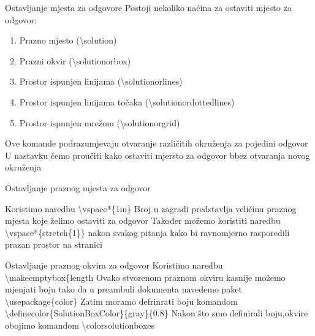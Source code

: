 \documentclass[addpoints,answers]{beamer}
\begin{document}
\begin{frame}{Ostavljanje mjesta za odgovore}
Postoji nekoliko naćina za ostaviti mjesto za odgovor:
\begin{enumerate}
\item Prazno mjesto (\color{blue}\textbackslash{solution}\color{black})
\item Prazni okvir (\color{blue}\textbackslash{solutionorbox}\color{black})
\item Prostor ispunjen linijama (\color{blue}\textbackslash{solutionorlines}\color{black})
\item Prostor ispunjen linijama točaka (\color{blue}\textbackslash{solutionordottedlines}\color{black})
\item Prostor ispunjen mrežom (\color{blue}\textbackslash{solutionorgrid}\color{black})
\newline\newline
\end{enumerate}
Ove komande podrazumjevaju otvaranje različitih okruženja za pojedini odgovor \newline
U nastavku čemo proučiti kako ostaviti mjersto za odgovor bbez otvaranja novog okruženja
\end{frame}

\begin{frame}{Ostavljanje praznog mjesta za odgovor}

Koristimo naredbu \color{blue}\textbackslash{vspace*\{1in\}}\color{black}
\newline
Broj u zagradi predstavlja veličinu praznog mjesta koje želimo ostaviti za odgovor
\newline
Također možemo koristiti naredbu \color{blue}\textbackslash{vspace*\{stretch\{1\}\}}\color{black} nakon svakog pitanja kako bi ravnomjerno rasporedili prazan prostor na stranici

\end{frame}

\begin{frame}{Ostavljanje praznog okvira za odgovor}
Koristimo naredbu \color{blue}\textbackslash{makeemptybox\{length}\color{black}
\newline
Ovako stvorenom praznom okviru kasnije možemo mjenjati boju tako da u preambuli dokumenta navedemo paket \color{blue}\textbackslash{usepackage\{color\}}\color{black}
\newline
\newline
Zatim moramo defrinrati boju komandom\newline
\color{blue}\textbackslash{definecolor\{SolutionBoxColor\}\{gray\}\{0.8\}}\color{black}
\newline
\newline
Nakon što smo definirali boju,okvire obojimo komandom \color{blue}\textbackslash{colorsolutionboxes}\color{black}

\end{frame}
\end{document}
